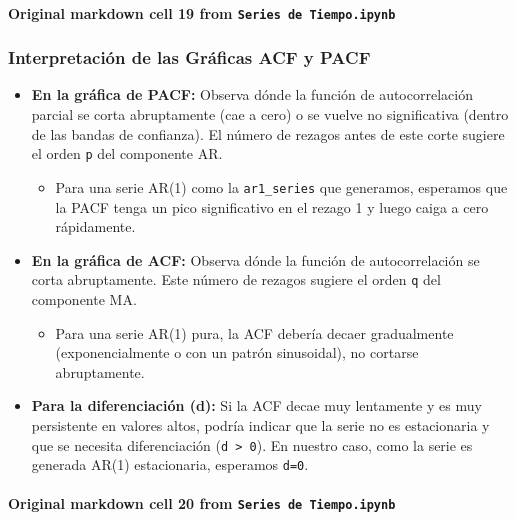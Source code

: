 \documentclass[
  11pt,
]{article}
\providecommand{\tightlist}{%
  \setlength{\itemsep}{0pt}\setlength{\parskip}{0pt}}
\begin{document}
\paragraph{\texorpdfstring{Original markdown cell 19 from \texttt{Series\ de\ Tiempo.ipynb}}{Original markdown cell 19 from Series de Tiempo.ipynb}}\label{original-markdown-cell-19-from-series-de-tiempoipynb}

\subsubsection{Interpretación de las Gráficas ACF y PACF}\label{interpretaciuxf3n-de-las-gruxe1ficas-acf-y-pacf}

\begin{itemize}
\item
  \textbf{En la gráfica de PACF:} Observa dónde la función de autocorrelación parcial se corta abruptamente (cae a cero) o se vuelve no significativa (dentro de las bandas de confianza). El número de rezagos antes de este corte sugiere el orden \texttt{p} del componente AR.

  \begin{itemize}
  \tightlist
  \item
    Para una serie AR(1) como la \texttt{ar1\_series} que generamos, esperamos que la PACF tenga un pico significativo en el rezago 1 y luego caiga a cero rápidamente.
  \end{itemize}
\item
  \textbf{En la gráfica de ACF:} Observa dónde la función de autocorrelación se corta abruptamente. Este número de rezagos sugiere el orden \texttt{q} del componente MA.

  \begin{itemize}
  \tightlist
  \item
    Para una serie AR(1) pura, la ACF debería decaer gradualmente (exponencialmente o con un patrón sinusoidal), no cortarse abruptamente.
  \end{itemize}
\item
  \textbf{Para la diferenciación (d):} Si la ACF decae muy lentamente y es muy persistente en valores altos, podría indicar que la serie no es estacionaria y que se necesita diferenciación (\texttt{d\ \textgreater{}\ 0}). En nuestro caso, como la serie es generada AR(1) estacionaria, esperamos \texttt{d=0}.
\end{itemize}

\paragraph{\texorpdfstring{Original markdown cell 20 from \texttt{Series\ de\ Tiempo.ipynb}}{Original markdown cell 20 from Series de Tiempo.ipynb}}\label{original-markdown-cell-20-from-series-de-tiempoipynb}
\end{document}
